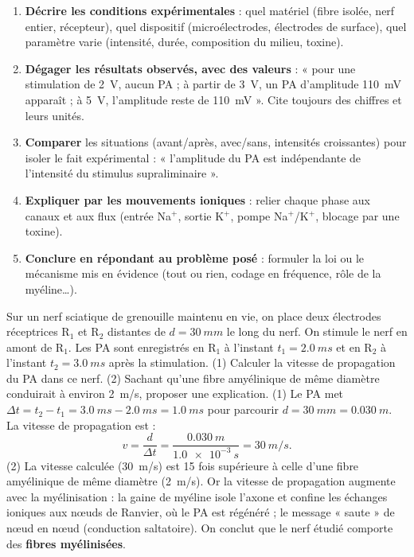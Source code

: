 \documentclass[11pt]{article}
\begin{document}
\begin{methode}
\begin{enumerate}
\item \textbf{Décrire les conditions expérimentales} : quel matériel (fibre isolée, nerf entier, récepteur), quel dispositif (microélectrodes, électrodes de surface), quel paramètre varie (intensité, durée, composition du milieu, toxine).
\item \textbf{Dégager les résultats observés, avec des valeurs} : « pour une stimulation de \SI{2}{V}, aucun PA ; à partir de \SI{3}{V}, un PA d'amplitude \SI{110}{mV} apparaît ; à \SI{5}{V}, l'amplitude reste de \SI{110}{mV} ». Cite toujours des chiffres et leurs unités.
\item \textbf{Comparer} les situations (avant/après, avec/sans, intensités croissantes) pour isoler le fait expérimental : « l'amplitude du PA est indépendante de l'intensité du stimulus supraliminaire ».
\item \textbf{Expliquer par les mouvements ioniques} : relier chaque phase aux canaux et aux flux (entrée Na$^+$, sortie K$^+$, pompe Na$^+$/K$^+$, blocage par une toxine).
\item \textbf{Conclure en répondant au problème posé} : formuler la loi ou le mécanisme mis en évidence (tout ou rien, codage en fréquence, rôle de la myéline\ldots).
\end{enumerate}
\end{methode}

\begin{exoresolu}
Sur un nerf sciatique de grenouille maintenu en vie, on place deux électrodes réceptrices R$_1$ et R$_2$ distantes de $d = \SI{30}{mm}$ le long du nerf. On stimule le nerf en amont de R$_1$. Les PA sont enregistrés en R$_1$ à l'instant $t_1 = \SI{2,0}{ms}$ et en R$_2$ à l'instant $t_2 = \SI{3,0}{ms}$ après la stimulation. (1) Calculer la vitesse de propagation du PA dans ce nerf. (2) Sachant qu'une fibre amyélinique de même diamètre conduirait à environ \SI{2}{m/s}, proposer une explication.
\tcblower
(1) Le PA met $\Delta t = t_2 - t_1 = \SI{3,0}{ms} - \SI{2,0}{ms} = \SI{1,0}{ms}$ pour parcourir $d = \SI{30}{mm} = \SI{0,030}{m}$. La vitesse de propagation est :
\[
v = \frac{d}{\Delta t} = \frac{\SI{0,030}{m}}{\SI{1,0e-3}{s}} = \SI{30}{m/s}.
\]
(2) La vitesse calculée (\SI{30}{m/s}) est 15 fois supérieure à celle d'une fibre amyélinique de même diamètre (\SI{2}{m/s}). Or la vitesse de propagation augmente avec la myélinisation : la gaine de myéline isole l'axone et confine les échanges ioniques aux nœuds de Ranvier, où le PA est régénéré ; le message « saute » de nœud en nœud (conduction saltatoire). On conclut que le nerf étudié comporte des \textbf{fibres myélinisées}.
\end{exoresolu}
\end{document}
